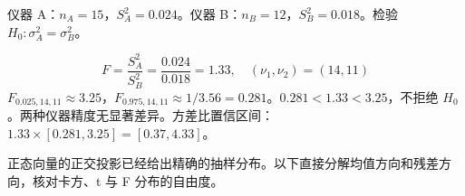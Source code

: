 \begin{exbox}[两种仪器精度比较]
仪器 A：$n_A=15$，$S_A^2=0.024$。仪器 B：$n_B=12$，$S_B^2=0.018$。检验 $H_0:\sigma_A^2=\sigma_B^2$。

\[
F=\frac{S_A^2}{S_B^2}=\frac{0.024}{0.018}=1.33,\quad(\nu_1,\nu_2)=(14,11)
\]
$F_{0.025,14,11}\approx3.25$，$F_{0.975,14,11}\approx1/3.56=0.281$。$0.281<1.33<3.25$，不拒绝 $H_0$。两种仪器精度无显著差异。方差比置信区间：$1.33\times[0.281,3.25]=[0.37,4.33]$。
\end{exbox}
正态向量的正交投影已经给出精确的抽样分布。以下直接分解均值方向和残差方向，核对卡方、t 与 F 分布的自由度。



